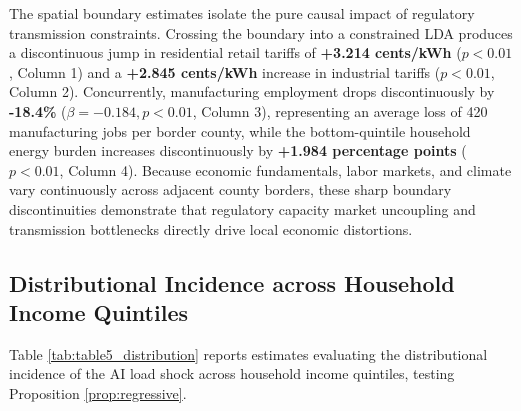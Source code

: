 \documentclass[11pt,a4paper]{article}
\begin{document}
The spatial boundary estimates isolate the pure causal impact of regulatory transmission constraints. Crossing the boundary into a constrained LDA produces a discontinuous jump in residential retail tariffs of \textbf{+3.214 cents/kWh} ($p < 0.01$, Column 1) and a \textbf{+2.845 cents/kWh} increase in industrial tariffs ($p < 0.01$, Column 2). Concurrently, manufacturing employment drops discontinuously by \textbf{-18.4\%} ($\beta = -0.184, p < 0.01$, Column 3), representing an average loss of 420 manufacturing jobs per border county, while the bottom-quintile household energy burden increases discontinuously by \textbf{+1.984 percentage points} ($p < 0.01$, Column 4). Because economic fundamentals, labor markets, and climate vary continuously across adjacent county borders, these sharp boundary discontinuities demonstrate that regulatory capacity market uncoupling and transmission bottlenecks directly drive local economic distortions.

\subsection{Distributional Incidence across Household Income Quintiles}

Table \ref{tab:table5_distribution} reports estimates evaluating the distributional incidence of the AI load shock across household income quintiles, testing Proposition \ref{prop:regressive}.
\end{document}
